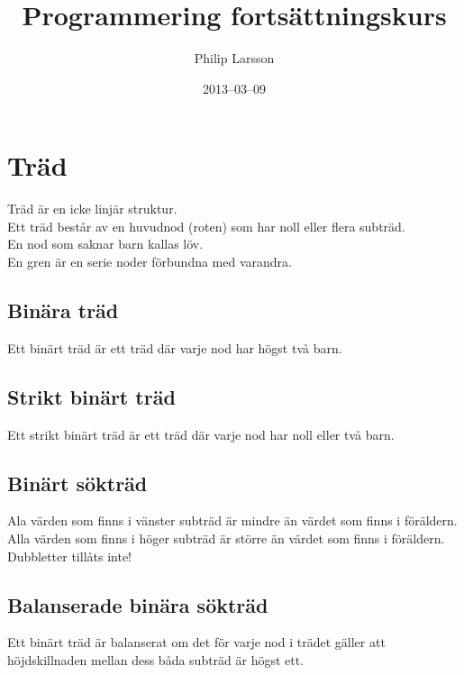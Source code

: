 \documentclass[11pt]{article}
\title{Programmering fortsättningskurs}
\author{Philip Larsson}
\date{2013--03--09}
\begin{document}
\maketitle
\scriptsize
\tableofcontents
\normalsize

\section{Träd}
Träd är en icke linjär struktur. \\
Ett träd består av en huvudnod (roten) som har noll eller flera subträd. \\
En nod som saknar barn kallas löv. \\
En gren är en serie noder förbundna med varandra. 
\subsection{Binära träd}
Ett binärt träd är ett träd där varje nod har högst två barn.
\subsection{Strikt binärt träd}
Ett strikt binärt träd är ett träd där varje nod har noll eller två barn. 
\subsection{Binärt sökträd}
Ala värden som finns i vänster subträd är mindre än värdet som finns i föräldern. Alla värden som finns i höger subträd är större än värdet som finns i föräldern. \\
Dubbletter tillåts inte!  
\subsection{Balanserade binära sökträd}
Ett binärt träd är balanserat om det för varje nod i trädet gäller att höjdskillnaden mellan dess båda subträd är högst ett. 
\clearpage
\end{document}
